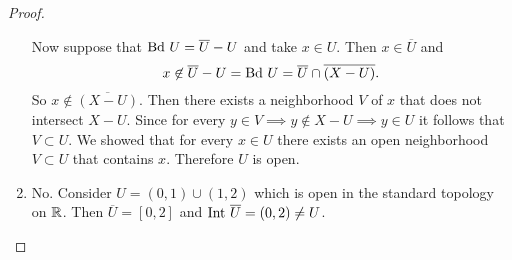 \begin{proof}
\begin{enumerate}
            Now suppose that $\text{Bd } U = \overline{U}-U$ and take $x\in U$. Then $x\in\overline{U}$ and
                $$x\not\in \overline{U}-U=\text{Bd } U=\overline{U}\cap\overline{\left(X-U\right)}.$$
            So $x\not\in\overline{\left(X-U\right)}$. Then there exists a neighborhood $V$ of $x$ that does not intersect $X-U$.
            Since for every $y\in V\implies y\not\in X-U\implies y\in U$ it follows that $V\subset U$.
            We showed that for every $x\in U$ there exists an open neighborhood $V\subset U$ that contains $x$. Therefore $U$ is open.
        \item No. Consider $U=(0,1)\cup(1,2)$ which is open in the standard topology on $\mathbb{R}$.
            Then $\overline{U}=[0,2]$ and $\text{Int }\overline{U}=(0,2)\neq U$.
   \end{enumerate} 
\end{proof}